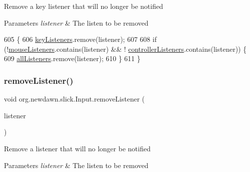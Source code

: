 Remove a key listener that will no longer be notified


\begin{DoxyParams}{Parameters}
{\em listener} & The listen to be removed \\
\hline
\end{DoxyParams}

\begin{DoxyCode}
605                                                         \{
606         \mbox{\hyperlink{classorg_1_1newdawn_1_1slick_1_1_input_a9a68e6a9e9441fea9793f57603be2f96}{keyListeners}}.remove(listener);
607         
608         \textcolor{keywordflow}{if} (!\mbox{\hyperlink{classorg_1_1newdawn_1_1slick_1_1_input_a14f9c58eb48c498073f11c6934d92998}{mouseListeners}}.contains(listener) && !
      \mbox{\hyperlink{classorg_1_1newdawn_1_1slick_1_1_input_a762495b937bf0e42b5dbfaa29bdb1b98}{controllerListeners}}.contains(listener)) \{
609             \mbox{\hyperlink{classorg_1_1newdawn_1_1slick_1_1_input_a26d5ed77d8b0444118d630336d0ab6d7}{allListeners}}.remove(listener);
610         \}
611     \}
\end{DoxyCode}
\mbox{\label{classorg_1_1newdawn_1_1slick_1_1_input_aae571a447fe305999e44efaf86c15251}} 
\subsubsection{\texorpdfstring{remove\+Listener()}{removeListener()}}
{\footnotesize\ttfamily void org.\+newdawn.\+slick.\+Input.\+remove\+Listener (\begin{DoxyParamCaption}\item[{\mbox{\hyperlink{interfaceorg_1_1newdawn_1_1slick_1_1_input_listener}{Input\+Listener}}}]{listener }\end{DoxyParamCaption})\hspace{0.3cm}{\ttfamily [inline]}}

Remove a listener that will no longer be notified


\begin{DoxyParams}{Parameters}
{\em listener} & The listen to be removed \\
\hline
\end{DoxyParams}

